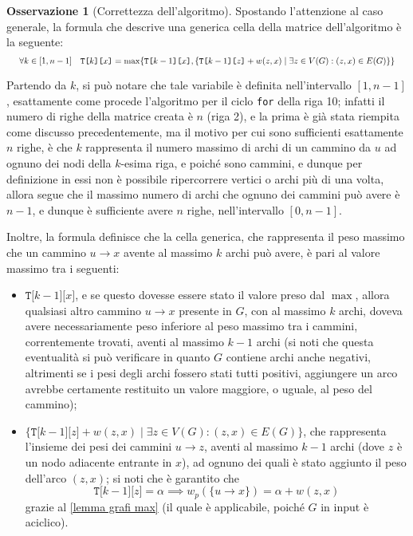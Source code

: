 \documentclass[14pt]{extreport}
\theoremstyle{definition}
\theoremstyle{definition}
\newtheorem{remark}{Osservazione}[subsection]
\begin{document}
\begin{remark}[Correttezza dell'algoritmo]
    Spostando l'attenzione al caso generale, la formula che descrive una generica cella della matrice dell'algoritmo è la seguente:
    \begin{equation*}
        \resizebox{.99\hsize}{!}{
            $\forall k \in [1, n-1] \quad \texttt{T[}k\texttt{][}x\texttt{]} = \max\{ \texttt{T[}k -1\texttt{][}x\texttt{]},\{\texttt{T[}k-1\texttt{][}z\texttt{]} + w(z, x) \mid \exists z \in V(G) : (z, x) \in E(G) \}\}$
        }
    \end{equation*}

    Partendo da $k$, si può notare che tale variabile è definita nell'intervallo $[1, n - 1]$, esattamente come procede l'algoritmo per il ciclo \texttt{for} della riga 10; infatti il numero di righe della matrice creata è $n$ (riga 2), e la prima è già stata riempita come discusso precedentemente, ma il motivo per cui sono sufficienti esattamente $n$ righe, è che $k$ rappresenta il numero massimo di archi di un cammino da $u$ ad ognuno dei nodi della $k$-esima riga, e poiché sono cammini, e dunque per definizione in essi non è possibile ripercorrere vertici o archi più di una volta, allora segue che il massimo numero di archi che ognuno dei cammini può avere è $n - 1$, e dunque è sufficiente avere $n$ righe, nell'intervallo $[0, n - 1]$.

    Inoltre, la formula definisce che la cella generica, che rappresenta il peso massimo che un cammino $u \rightarrow x$ avente al massimo $k$ archi può avere, è pari al valore massimo tra i seguenti:

    \begin{itemize}
        \item $\texttt{T[}k - 1\texttt{][}x\texttt{]}$, e se questo dovesse essere stato il valore preso dal $\max$, allora qualsiasi altro cammino $u \rightarrow x$ presente in $G$, con al massimo $k$ archi, doveva avere necessariamente peso inferiore al peso massimo tra i cammini, correntemente trovati, aventi al massimo $k - 1$ archi (si noti che questa eventualità si può verificare in quanto $G$ contiene archi anche negativi, altrimenti se i pesi degli archi fossero stati tutti positivi, aggiungere un arco avrebbe certamente restituito un valore maggiore, o uguale, al peso del cammino);
        \item $\{\texttt{T[}k-1\texttt{][}z\texttt{]} + w(z, x) \mid \exists z \in V(G) : (z, x) \in E(G) \}$, che rappresenta l'insieme dei pesi dei cammini $u \rightarrow z$, aventi al massimo $k - 1$ archi (dove $z$ è un nodo adiacente entrante in $x$), ad ognuno dei quali è stato aggiunto il peso dell'arco $(z, x)$; si noti che è garantito che $$\texttt{T[}k - 1\texttt{][}z\texttt{]} = \alpha \implies w_p(\{u \rightarrow x\}) = \alpha + w(z, x)$$ grazie al \cref{lemma grafi max} (il quale è applicabile, poiché $G$ in input è aciclico).
    \end{itemize}


\end{remark}
\end{document}
